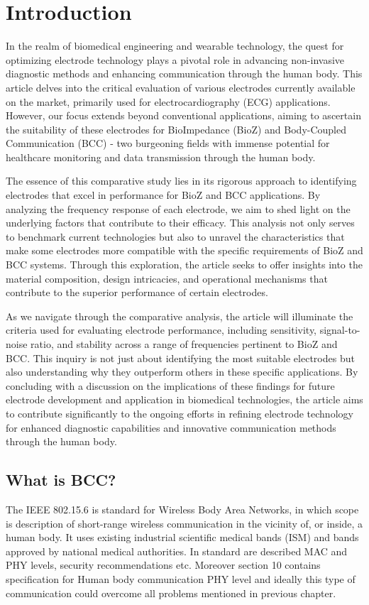 \section{Introduction}

In the realm of biomedical engineering and wearable technology, the quest for optimizing electrode technology plays a pivotal role in advancing non-invasive diagnostic methods and enhancing communication through the human body. This article delves into the critical evaluation of various electrodes currently available on the market, primarily used for electrocardiography (ECG) applications. However, our focus extends beyond conventional applications, aiming to ascertain the suitability of these electrodes for BioImpedance (BioZ) and Body-Coupled Communication (BCC) - two burgeoning fields with immense potential for healthcare monitoring and data transmission through the human body.

The essence of this comparative study lies in its rigorous approach to identifying electrodes that excel in performance for BioZ and BCC applications. By analyzing the frequency response of each electrode, we aim to shed light on the underlying factors that contribute to their efficacy. This analysis not only serves to benchmark current technologies but also to unravel the characteristics that make some electrodes more compatible with the specific requirements of BioZ and BCC systems. Through this exploration, the article seeks to offer insights into the material composition, design intricacies, and operational mechanisms that contribute to the superior performance of certain electrodes.

As we navigate through the comparative analysis, the article will illuminate the criteria used for evaluating electrode performance, including sensitivity, signal-to-noise ratio, and stability across a range of frequencies pertinent to BioZ and BCC. This inquiry is not just about identifying the most suitable electrodes but also understanding why they outperform others in these specific applications. By concluding with a discussion on the implications of these findings for future electrode development and application in biomedical technologies, the article aims to contribute significantly to the ongoing efforts in refining electrode technology for enhanced diagnostic capabilities and innovative communication methods through the human body.
\iffalse
\subsection{What is BCC?}
\quad The IEEE 802.15.6 is standard for Wireless Body Area Networks, in which scope is description of short-range wireless communication in the vicinity of, or inside, a human body. It uses existing industrial scientific medical bands (ISM) and bands approved by national medical authorities. In standard are described MAC and PHY levels, security recommendations etc. Moreover section 10 contains specification for Human body communication PHY level and ideally this type of communication could overcome all problems mentioned in previous chapter.

